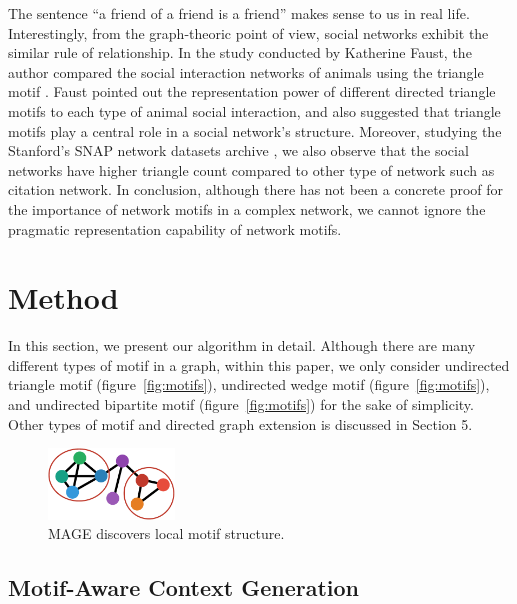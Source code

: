 \documentclass[letterpaper]{article}
\begin{document}
            The sentence ``a friend of a friend is a friend'' makes sense to us in real life. Interestingly,
            from the graph-theoric point of view, social networks exhibit the similar rule of relationship.
            In the study conducted by Katherine Faust, the author compared the social interaction 
            networks of animals using the triangle motif \cite{comsocialnetwork}. Faust pointed
            out the representation power of different directed triangle motifs to each type of animal social
            interaction, and also suggested that triangle motifs play a central role in a social network's
            structure. Moreover, studying the Stanford's SNAP network datasets archive \cite{SNAP}, 
            we also observe that the social networks have higher triangle count compared to other type of 
            network such as citation network. In conclusion, although there has not been a concrete proof 
            for the importance of network motifs in a complex network, we cannot ignore the pragmatic 
            representation capability of network motifs.

    \section{Method}

        In this section, we present our algorithm in detail. Although there are many different types of motif
        in a graph, within this paper, we only consider undirected triangle motif (figure~\ref{fig:motifs}),
        undirected wedge motif (figure~\ref{fig:motifs}), and undirected bipartite motif 
        (figure~\ref{fig:motifs}) for the sake of simplicity. Other types of motif and directed graph
        extension is discussed in Section 5.

        \begin{figure}
            \centering
            \includegraphics[width=0.3\textwidth]{fig5_mage}
            \caption{MAGE discovers local motif structure.}
            \label{fig:n2v}
        \end{figure}

        \subsection{Motif-Aware Context Generation}
\end{document}
